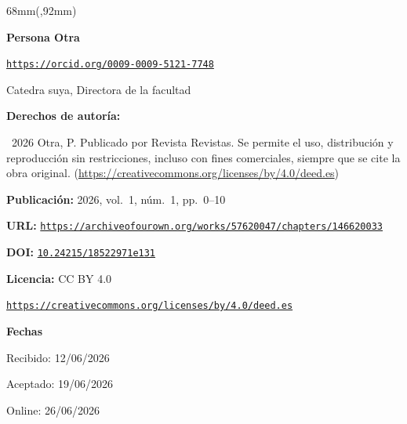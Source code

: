\begin{textblock*}{68mm}(\gbbloquex,92mm)
{\setlength{\leftskip}{0pt}\setlength{\parindent}{0pt}%
\noindent\begin{minipage}[t]{68mm}
\sffamily\small\setlength{\parskip}{1pt}
{\bfseries\color{azulrevista}Persona Otra}\par
{\scriptsize\texttt{\href{https://orcid.org/0009-0009-5121-7748}{https://orcid.org/0009-0009-5121-7748}}}\par
Catedra suya, Directora de la facultad\par
\vspace{6pt}
{\bfseries\color{azulrevista!70}Derechos de autor\'ia:}\par
\textcopyright\ 2026 Otra, P. Publicado por Revista Revistas. Se permite el uso, distribución y reproducción sin restricciones, incluso con fines comerciales, siempre que se cite la obra original. (\href{https://creativecommons.org/licenses/by/4.0/deed.es}{https://creativecommons.org/licenses/by/4.0/deed.es})\par\vspace{6pt}
{\bfseries\color{azulrevista!70}Publicación:} 2026, vol.~1, n\'um.~1, pp.~0--10\par\vspace{6pt}
{\bfseries\color{azulrevista!70}URL:} {\scriptsize\texttt{\href{https://archiveofourown.org/works/57620047/chapters/146620033}{https://archiveofourown.org/works/57620047/chapters/146620033}}}\par\vspace{6pt}
{\bfseries\color{azulrevista!70}DOI:} {\scriptsize\texttt{\href{https://doi.org/10.24215/18522971e131}{10.24215/18522971e131}}}\par\vspace{6pt}
{\bfseries\color{azulrevista!70}Licencia:} CC BY 4.0\par
{\scriptsize\texttt{\href{https://creativecommons.org/licenses/by/4.0/deed.es}{https://creativecommons.org/licenses/by/4.0/deed.es}}}\par
\vspace{6pt}
{\bfseries\color{azulrevista!70}Fechas}\par\vspace{2pt}
Recibido: 12/06/2026\par
Aceptado: 19/06/2026\par
Online: 26/06/2026\par
\vspace{6pt}
\vspace{6pt}

\end{minipage}}
\end{textblock*}
